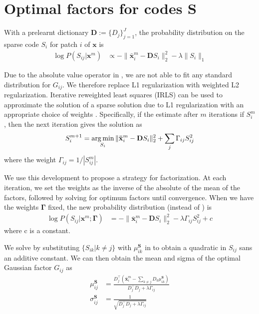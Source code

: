 \chapter{Optimal factors for codes $\mathbf{S}$ }
\label{app:factorParamsS}

With a prelearnt dictionary $\mathbf{D} := \lbrace D_j \rbrace_{j=1}^{J}$, the probability distribution on the sparse code $S_i$ for patch $i$ of $\mathbf{x}$ is
\begin{align}
\log P(S_{ij} | \mathbf{x}^m) &\propto - \| \mathbf{\bar{x}}^m_i - \mathbf{D} S_i \|_2^2 - \lambda \| S_i \|_1 \label{eqn:deriveSFactors}
\end{align}

Due to the absolute value operator in , we are not able to fit any standard distribution for $G_{ij}$. We therefore replace L1 regularization with weighted L2 regularization. Iterative reweighted least squares (IRLS) can be used to approximate the solution of a sparse solution due to L1 regularization with an appropriate choice of weights \cite{chartrand2008iteratively}. Specifically, if the estimate after $m$ iterations if $S^m_i$, then the next iteration gives the solution as
\begin{align}
S^{m+1}_i = \operatorname*{arg\,min}_{S_i} \| \mathbf{\bar{x}}^m_i - \mathbf{D} S_i \|^2_2 + \sum_{j} \Gamma_{ij} S_{ij}^2
\end{align}
where the weight $\Gamma_{ij} = 1/| S^m_{ij} |$.

We use this development to propose a strategy for factorization. At each iteration, we set the weights as the inverse of the absolute of the mean of the factors, followed by solving for optimum factors until convergence. When we have the weights $\mathbf{\Gamma}$ fixed, the new probability distribution (instead of ) is
\begin{align}
\log P(S_{ij} | \mathbf{x}^m; \mathbf{\Gamma}) &= - \| \mathbf{\bar{x}}^m_i - \mathbf{D} S_i \|_2^2 - \lambda \Gamma_{ij} S_{ij}^2 + c \label{eqn:deriveSFactors2}
\end{align}
where c is a constant.

We solve  by substituting $\lbrace S_{ik} | k \neq j \rbrace$ with $\mu^\mathbf{S}_{ik}$ in  to obtain a quadratic in $S_{ij}$ sans an additive constant. We can then obtain the mean and sigma of the optimal Gaussian factor $G_{ij}$ as
\begin{align}
\mu^\mathbf{S}_{ij} &= \frac{ D_j^\intercal \left( \mathbf{\bar{x}}^m_i - \sum_{k \neq j} D_k \mu^\mathbf{S}_{ik} \right) }{ D_j^\intercal D_j + \lambda \Gamma_{ij} } \\
\sigma^\mathbf{S}_{ij} &= \frac{1}{\sqrt{ D_j^\intercal D_j + \lambda \Gamma_{ij} }}
\end{align}
